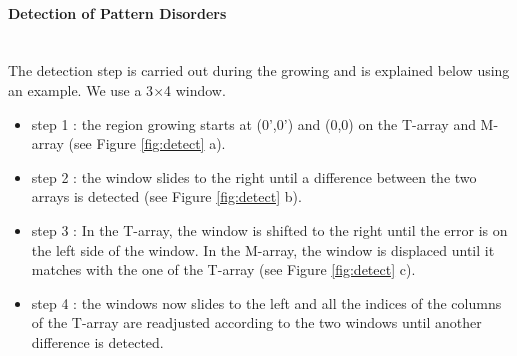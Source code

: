 \paragraph*{Detection of Pattern Disorders}
~~\\
The detection step is carried out during the growing and is explained below using an example. We use a 3$\times$4 window.
\begin{itemize}
\item step 1 : the region growing starts at (0',0') and (0,0) on the T-array and M-array (see Figure \ref{fig:detect} a).
\item step 2 : the window slides to the right until a difference between the two arrays is detected (see Figure \ref{fig:detect} b).
\item step 3 : In the T-array, the window is shifted to the right until the error is on the left side of the window. In the M-array, the window is displaced until it matches with the one of the T-array (see Figure \ref{fig:detect} c).
\item step 4 : the windows now slides to the left and all the indices of the columns of the T-array are readjusted according to the two windows until another difference is detected.
\end{itemize}

